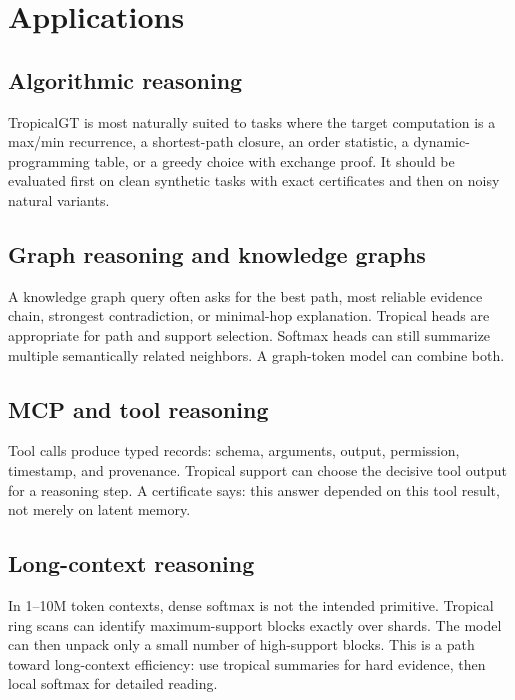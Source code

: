 \documentclass[11pt]{article}
\begin{document}
\section{Applications}

\subsection{Algorithmic reasoning}

TropicalGT is most naturally suited to tasks where the target computation is a max/min recurrence, a shortest-path closure, an order statistic, a dynamic-programming table, or a greedy choice with exchange proof.  It should be evaluated first on clean synthetic tasks with exact certificates and then on noisy natural variants.

\subsection{Graph reasoning and knowledge graphs}

A knowledge graph query often asks for the best path, most reliable evidence chain, strongest contradiction, or minimal-hop explanation.  Tropical heads are appropriate for path and support selection.  Softmax heads can still summarize multiple semantically related neighbors.  A graph-token model can combine both.

\subsection{MCP and tool reasoning}

Tool calls produce typed records: schema, arguments, output, permission, timestamp, and provenance.  Tropical support can choose the decisive tool output for a reasoning step.  A certificate says: this answer depended on this tool result, not merely on latent memory.

\subsection{Long-context reasoning}

In 1--10M token contexts, dense softmax is not the intended primitive.  Tropical ring scans can identify maximum-support blocks exactly over shards.  The model can then unpack only a small number of high-support blocks.  This is a path toward long-context efficiency: use tropical summaries for hard evidence, then local softmax for detailed reading.
\end{document}
